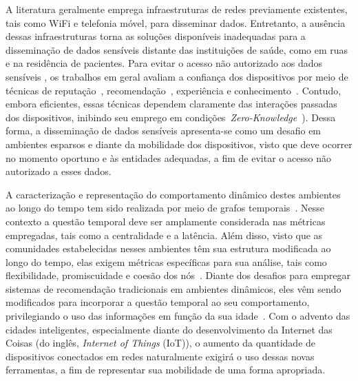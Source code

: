 \documentclass[12pt]{article}
\newcommand{\as}[1]{\textcolor{blue}{{\bf #1}}}
\begin{document}

A literatura geralmente emprega infraestruturas de redes previamente existentes, tais como WiFi e telefonia móvel, para disseminar dados.
Entretanto, a ausência dessas infraestruturas torna as soluções disponíveis inadequadas para a disseminação de dados sensíveis
distante das
instituições de saúde, como em ruas e na residência de pacientes. Para evitar o acesso não autorizado aos dados sensíveis , os trabalhos
em geral avaliam a confiança dos dispositivos por meio de técnicas de reputação~\cite{truong2017toward}, recomendação~\cite{al2017trust}, experiência e conhecimento~\cite{truong2017toward}. Contudo,
embora eficientes,
essas técnicas dependem
claramente
das interações passadas dos dispositivos, inibindo seu emprego em condições~\textit{Zero-Knowledge}~\cite{feige1988zero,kim2015hcs}).
Dessa forma, a disseminação de dados sensíveis apresenta-se como um desafio em ambientes esparsos e diante da mobilidade dos dispositivos, visto que deve ocorrer no momento oportuno e às entidades adequadas, a fim de evitar o acesso não autorizado a esses dados.

A caracterização e representação do comportamento dinâmico destes ambientes ao longo do tempo tem sido realizada por meio de grafos temporais~\cite{nzeko2017time}. Nesse contexto a questão temporal deve ser amplamente considerada nas métricas empregadas, tais como a centralidade e a latência. Além disso, visto que as comunidades estabelecidas nesses ambientes têm sua estrutura modificada ao longo do tempo, elas exigem métricas específicas para sua análise, tais como flexibilidade, promiscuidade e coesão dos nós~\cite{sizemore2018dynamic}. Diante dos desafios para empregar sistemas de recomendação tradicionais em ambientes dinâmicos, eles vêm sendo modificados para incorporar a questão temporal ao seu comportamento, privilegiando o uso das informações em função da sua idade~\cite{nzeko2017time}. Com o advento das cidades inteligentes, especialmente diante do desenvolvimento da Internet das Coisas (do inglês, \textit{Internet of Things} (IoT)), o aumento da quantidade de dispositivos conectados em redes naturalmente exigirá o uso dessas novas ferramentas, a fim de representar sua mobilidade de uma forma apropriada.
\end{document}
